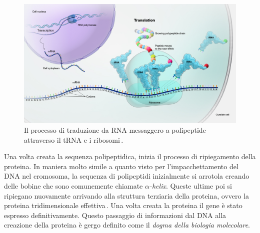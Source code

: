 \begin{figure}[b!]
    \centering
    \includegraphics[width=\textwidth]{assets/mrna-translation.jpg}
    \caption[Il processo di traduzione da mRNA a polipeptide.]{Il processo di traduzione da RNA messaggero a polipeptide attraverso il tRNA e i ribosomi\,\cite{nhgri_translation_image}.}\label{fig:mrna-translation}
\end{figure}

Una volta creata la sequenza polipeptidica, inizia il processo di ripiegamento della proteina. In maniera molto simile a quanto visto per l'impacchettamento del DNA nel cromosoma, la sequenza di polipeptidi inizialmente si arrotola creando delle bobine che sono comunemente chiamate $\alpha$\textit{-helix}. Queste ultime poi si ripiegano nuovamente arrivando alla struttura terziaria della proteina, ovvero la proteina tridimensionale effettiva\,\cite{schulz2013principles}. Una volta creata la proteina il gene è stato espresso definitivamente. Questo passaggio di informazioni dal DNA alla creazione della proteina è gergo definito come il \textsl{dogma della biologia molecolare}.


